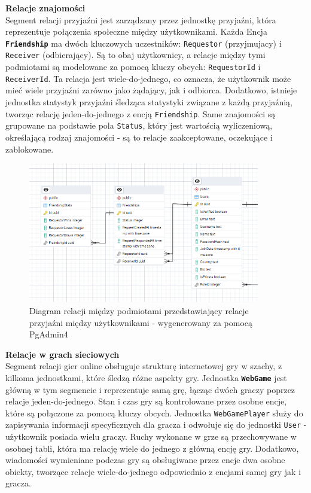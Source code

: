 \documentclass[12pt,a4paper]{article}
\begin{document}
\newpage

\noindent \textbf{Relacje znajomości}\\
Segment relacji przyjaźni jest zarządzany przez jednostkę przyjaźni, która reprezentuje połączenia społeczne między użytkownikami. Każda Encja \textbf{\texttt{Friendship}} ma dwóch kluczowych uczestników: \texttt{Requestor} (przyjmujacy) i \texttt{Receiver} (odbierający). Są to obaj użytkownicy, a relacje między tymi podmiotami są modelowane za pomocą kluczy obcych: \texttt{RequestorId} i \texttt{ReceiverId}. Ta relacja jest wiele-do-jednego, co oznacza, że użytkownik może mieć wiele przyjaźni zarówno jako żądający, jak i odbiorca. Dodatkowo, istnieje jednostka statystyk przyjaźni śledząca statystyki związane z każdą przyjaźnią, tworząc relację jeden-do-jednego z encją \texttt{Friendship}. Same znajomości są grupowane na podstawie pola \texttt{Status}, który jest wartością wyliczeniową, określającą rodzaj znajomości - są to relacje zaakceptowane, oczekujące i zablokowane.

\vspace{1cm}
\begin{figure}[h!]
    \centering
    \includegraphics[width=0.9\textwidth]{images/ERD_friendship.png}
    \caption{Diagram relacji między podmiotami przedstawiający relacje przyjaźni między użytkownikami - wygenerowany za pomocą PgAdmin4}
\end{figure}

\newpage

\noindent \textbf{Relacje w grach sieciowych}\\
Segment relacji gier online obsługuje strukturę internetowej gry w szachy, z kilkoma jednostkami, które śledzą różne aspekty gry. Jednostka \textbf{\texttt{WebGame}} jest główną w tym segmencie i reprezentuje samą grę, łącząc dwóch graczy poprzez relacje jeden-do-jednego. Stan i czas gry są kontrolowane przez osobne encje, które są połączone za pomocą kluczy obcych. Jednostka \texttt{WebGamePlayer} służy do zapisywania informacji specyficznych dla gracza i odwołuje się do jednostki \texttt{User} - użytkownik posiada wielu graczy. Ruchy wykonane w grze są przechowywane w osobnej tabli, która ma relację wiele do jednego z główną encję gry. Dodatkowo, wiadomości wymieniane podczas gry są obsługiwane przez encje dwa osobne obiekty, tworzące relacje wiele-do-jednego odpowiednio z encjami samej gry jak i gracza.
\end{document}
